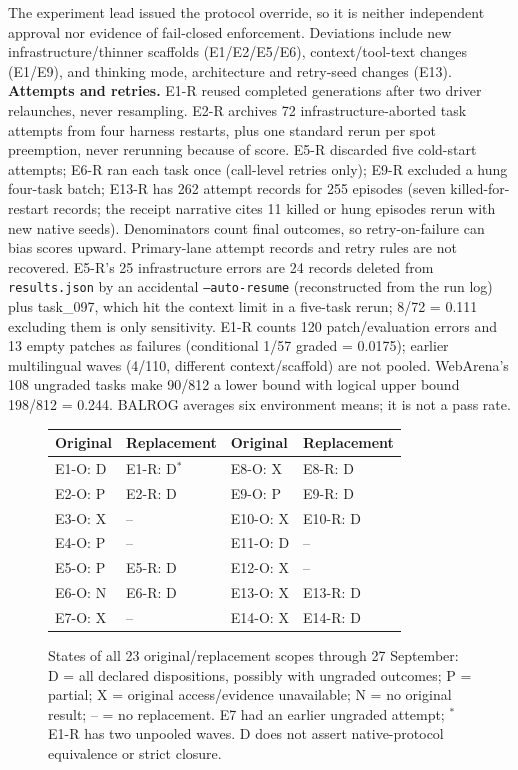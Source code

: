 \documentclass[a4paper,runningheads]{llncs}
\begin{document}
The experiment lead issued the protocol override, so it is neither independent
approval nor evidence of fail-closed enforcement. Deviations include new
infrastructure/thinner scaffolds (E1/E2/E5/E6), context/tool-text changes
(E1/E9), and thinking mode, architecture and retry-seed changes (E13).
\textbf{Attempts and retries.} E1-R reused completed generations after two
driver relaunches, never resampling. E2-R archives 72 infrastructure-aborted
task attempts from four harness restarts, plus one standard rerun per spot
preemption, never rerunning because of score. E5-R discarded five cold-start
attempts; E6-R ran each task once (call-level retries only); E9-R excluded a
hung four-task batch; E13-R has 262 attempt records for 255 episodes (seven
killed-for-restart records; the receipt narrative cites 11 killed or hung
episodes rerun with new native seeds). Denominators count final outcomes,
so retry-on-failure can bias scores upward. Primary-lane attempt records and
retry rules are not recovered. E5-R's 25 infrastructure errors are 24 records
deleted from \texttt{results.json} by an accidental \texttt{--auto-resume}
(reconstructed from the run log) plus task\_097, which hit the context limit in
a five-task rerun; 8/72 = 0.111 excluding them is only sensitivity. E1-R counts
120 patch/evaluation errors and 13 empty patches as failures (conditional 1/57
graded = 0.0175); earlier multilingual waves (4/110, different
context/scaffold) are not pooled. WebArena's 108 ungraded tasks make 90/812 a
lower bound with logical upper bound 198/812 = 0.244. BALROG averages six
environment means; it is not a pass rate.

\begin{figure}[t]\centering\small
\begin{tabular}{@{}l@{\quad}l@{\qquad}l@{\quad}l@{}}\toprule
Original & Replacement & Original & Replacement \\\midrule
E1-O: D & E1-R: D$^*$ & E8-O: X & E8-R: D \\
E2-O: P & E2-R: D & E9-O: P & E9-R: D \\
E3-O: X & -- & E10-O: X & E10-R: D \\
E4-O: P & -- & E11-O: D & -- \\
E5-O: P & E5-R: D & E12-O: X & -- \\
E6-O: N & E6-R: D & E13-O: X & E13-R: D \\
E7-O: X & -- & E14-O: X & E14-R: D \\\bottomrule
\end{tabular}
\caption{States of all 23 original/replacement scopes through 27 September:
D = all declared dispositions, possibly with ungraded outcomes; P = partial;
X = original access/evidence unavailable; N = no original result; -- = no
replacement. E7 had an earlier ungraded attempt; $^*$E1-R has two unpooled
waves. D does not assert native-protocol equivalence or strict closure.}
\label{fig:states}
\end{figure}
\end{document}
